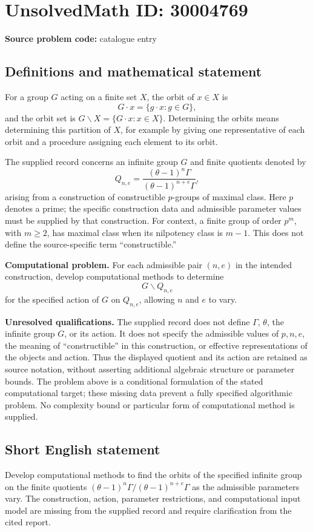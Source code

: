 \documentclass[11pt]{article}
\begin{document}
\section*{UnsolvedMath ID: 30004769}
\textbf{Source problem code:} catalogue entry
\subsection{Definitions and mathematical statement}
For a group \(G\) acting on a finite set \(X\), the orbit of \(x\in X\) is
\[
G\cdot x=\{g\cdot x:g\in G\},
\]
and the orbit set is \(G\backslash X=\{G\cdot x:x\in X\}\). Determining the orbits means determining this partition of \(X\), for example by giving one representative of each orbit and a procedure assigning each element to its orbit.

The supplied record concerns an infinite group \(G\) and finite quotients denoted by
\[
Q_{n,e}=\frac{(\theta-1)^n\Gamma}{(\theta-1)^{n+e}\Gamma},
\]
arising from a construction of constructible \(p\)-groups of maximal class. Here \(p\) denotes a prime; the specific construction data and admissible parameter values must be supplied by that construction. For context, a finite group of order \(p^m\), with \(m\geq2\), has maximal class when its nilpotency class is \(m-1\). This does not define the source-specific term ``constructible.''

\textbf{Computational problem.} For each admissible pair \((n,e)\) in the intended construction, develop computational methods to determine
\[
G\backslash Q_{n,e}
\]
for the specified action of \(G\) on \(Q_{n,e}\), allowing \(n\) and \(e\) to vary.

\textbf{Unresolved qualifications.} The supplied record does not define \(\Gamma\), \(\theta\), the infinite group \(G\), or its action. It does not specify the admissible values of \(p,n,e\), the meaning of ``constructible'' in this construction, or effective representations of the objects and action. Thus the displayed quotient and its action are retained as source notation, without asserting additional algebraic structure or parameter bounds. The problem above is a conditional formulation of the stated computational target; these missing data prevent a fully specified algorithmic problem. No complexity bound or particular form of computational method is supplied.
\subsection{Short English statement}
Develop computational methods to find the orbits of the specified infinite group on the finite quotients \((\theta-1)^n\Gamma/(\theta-1)^{n+e}\Gamma\) as the admissible parameters vary. The construction, action, parameter restrictions, and computational input model are missing from the supplied record and require clarification from the cited report.
\end{document}
